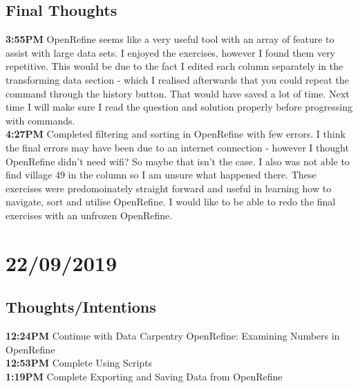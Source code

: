 \documentclass{article}
\begin{document}
\subsection{Final Thoughts}
\textbf{3:55PM} OpenRefine seems like a very useful tool with an array of feature to assist with large data sets. I enjoyed the exercises, however I found them very repetitive. This would be due to the fact I edited each column separately in the transforming data section - which I realised afterwards that you could repeat the command through the history button. That would have saved a lot of time. Next time I will make sure I read the question and solution properly before progressing with commands. \\
\textbf{4:27PM} Completed filtering and sorting in OpenRefine with few errors. I think the final errors may have been due to an internet connection - however I thought OpenRefine didn't need wifi? So maybe that isn't the case. I also was not able to find village 49 in the column so I am unsure what happened there. These exercises were predomoinately straight forward and useful in learning how to navigate, sort and utilise OpenRefine. I would like to be able to redo the final exercises with an unfrozen OpenRefine.

\section{22/09/2019}
\subsection{Thoughts/Intentions}
\textbf{12:24PM} Continue with Data Carpentry OpenRefine: Examining Numbers in OpenRefine \\
\textbf{12:53PM} Complete Using Scripts \\
\textbf{1:19PM} Complete Exporting and Saving Data from OpenRefine \\
\end{document}
